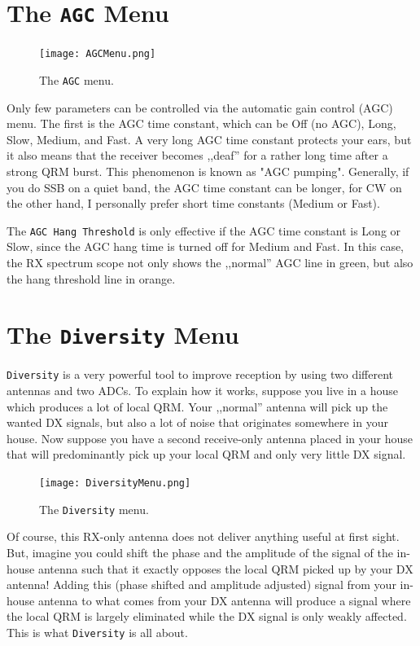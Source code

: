 \documentclass[12pt]{book}
\def\rett#1{\texttt{\color{red}#1}}
\def\bltt#1{\texttt{\color{blue}#1}}
\begin{document}
\section{The \texttt{AGC} Menu}

\begin{figure}[ht]
\center
\texttt{[image: AGCMenu.png]}
\caption{The \bltt{AGC} menu.}
\label{fig:AGCMenu}
\end{figure}

Only few parameters can be controlled via the automatic gain control (AGC) menu.
The first is the AGC time constant, which can be Off (no AGC), Long, Slow, Medium,
and Fast. A very long AGC time constant protects your ears, but it also means that
the receiver becomes ,,deaf'' for a rather long time after a strong QRM burst. This
phenomenon is known as "AGC pumping". Generally, if you do SSB on a quiet band, the
AGC time constant can be longer, for CW on the other hand, I personally prefer short
time constants (Medium or Fast).

The \rett{AGC Hang Threshold} is only effective if the AGC time constant is Long or Slow,
since the AGC hang time is turned off for Medium and Fast.
In this case, the RX spectrum scope not only shows the ,,normal'' AGC line in green,
but also the hang threshold line in orange.


\section{The \texttt{Diversity} Menu}

\bltt{Diversity} is a very powerful tool to improve reception by using two different
antennas and two ADCs. To explain how it works, suppose you live in a house which produces
a lot of local QRM. Your ,,normal'' antenna will pick up the wanted DX signals, but also
a lot of noise that originates somewhere in your house. Now suppose you have a second
receive-only antenna placed in your house that will predominantly pick up your local
QRM and only very little DX signal.

\begin{figure}[ht]
\center
\texttt{[image: DiversityMenu.png]}
\caption{The \bltt{Diversity} menu.}
\label{fig:DiversityMenu}
\end{figure}

Of course, this RX-only antenna does not deliver anything useful at first sight. But, imagine
you could shift the phase and the amplitude of the signal of the in-house antenna such that it
exactly opposes the local QRM picked up by your DX antenna! Adding this (phase shifted and amplitude
adjusted) signal from your in-house antenna to what comes from your DX antenna will produce
a signal where the local QRM is largely eliminated while the DX signal is only weakly affected.
This is what \bltt{Diversity} is all about.
\end{document}
